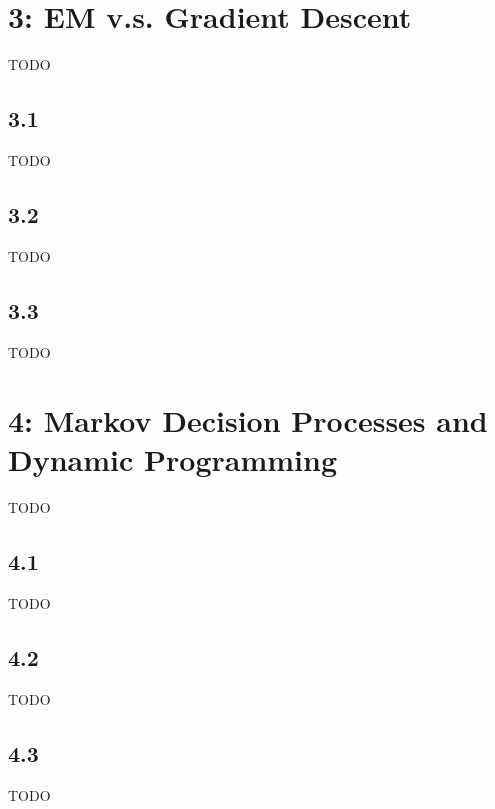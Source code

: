 \documentclass[12pt]{amsart}
\begin{document}
\section*{3: EM v.s. Gradient Descent}
TODO

\subsection*{3.1}
TODO

\subsection*{3.2}
TODO

\subsection*{3.3}
TODO

\section*{4: Markov Decision Processes and Dynamic Programming}
TODO

\subsection*{4.1}
TODO

\subsection*{4.2}
TODO

\subsection*{4.3}
TODO
\end{document}
